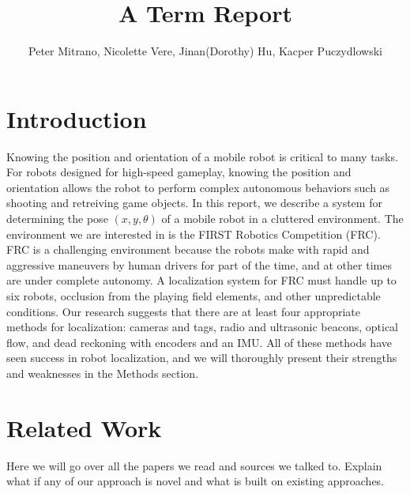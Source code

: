 \documentclass{article}
\begin{document}
\title{A Term Report}
\author{Peter Mitrano, Nicolette Vere, Jinan(Dorothy) Hu, Kacper Puczydlowski}

\maketitle{}

\section{Introduction}

Knowing the position and orientation of a mobile robot is critical to many tasks. For robots designed for high-speed gameplay, knowing the position and orientation allows the robot to perform complex autonomous behaviors such as shooting and retreiving game objects. In this report, we describe a system for determining the pose $(x, y, \theta)$ of a mobile robot in a cluttered environment. The environment we are interested in is the FIRST Robotics Competition (FRC). FRC is a challenging environment because the robots make with rapid and aggressive maneuvers by human drivers for part of the time, and at other times are under complete autonomy. A localization system for FRC must handle up to six robots, occlusion from the playing field elements, and other unpredictable conditions. Our research suggests that there are at least four appropriate methods for localization: cameras and tags, radio and ultrasonic beacons, optical flow, and dead reckoning with encoders and an IMU. All of these methods have seen success in robot localization, and we will thoroughly present their strengths and weaknesses in the Methods section.

\section{Related Work}

Here we will go over all the papers we read and sources we talked to. Explain what if any of our approach is novel and what is built on existing approaches.
\end{document}

